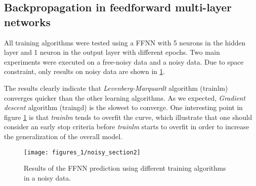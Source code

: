 \subsection{Backpropagation in feedforward multi-layer networks}

All training algorithms were tested using a FFNN with 5 neurons in the hidden layer and 1 neuron in the output layer with different epochs. Two main experiments were executed on a free-noisy data and a noisy data. Due to space constraint, only results on noisy data are shown in \ref{noisy_section2}.

\bigbreak
The results clearly indicate that \textit{Levenberg-Marquardt} algorithm (trainlm) converges quicker than the other learning algorithms. As we expected, \textit{Gradient descent} algorithm (traingd) is the slowest to converge. One interesting point in figure \ref{noisy_section2} is that \textit{trainlm} tends to overfit the curve, which illustrate that one should consider an early stop criteria before \textit{trainlm} starts to overfit in order to increase the generalization of the overall model.

\begin{figure}[!htbp]
\caption{Results of the FFNN prediction using different training algorithms in a noisy data.}
\label{noisy_section2}
\texttt{[image: figures\_1/noisy\_section2]}
\centering
\end{figure}


